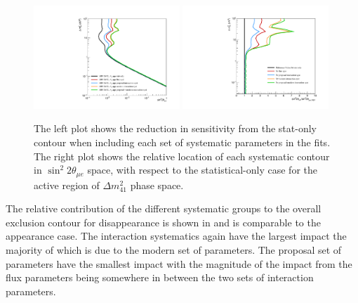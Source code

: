 \begin{figure}[h!]
    \centering
    \includegraphics[width = 0.49\textwidth]{figures-chap6/exclusion_contours/nue_app_syst_groups.pdf}
    \includegraphics[width = 0.49\textwidth]{figures-chap6/exclusion_contours/nue_app_syst_groups_ratios.pdf}
    \caption[Impact of the different systematic parameter groups on the \nue appearance sensitivity.]{The left plot shows the reduction in sensitivity from the stat-only contour when including each set of systematic parameters in the fits. The right plot shows the relative location of each systematic contour in $\sin^{2}2\theta_{\mu e}$ space, with respect to the statistical-only case for the active region of $\Delta m_{41}^{2}$ phase space.}
    \label{fig:nue_app_syst_group_sensitivities}
\end{figure}


The relative contribution of the different systematic groups to the overall exclusion contour for \nue disappearance is shown in  and is comparable to the \nue appearance case. The interaction systematics again have the largest impact the majority of which is due to the modern set of parameters. The proposal set of parameters have the smallest impact with the magnitude of the impact from the flux parameters being somewhere in between the two sets of interaction parameters.

